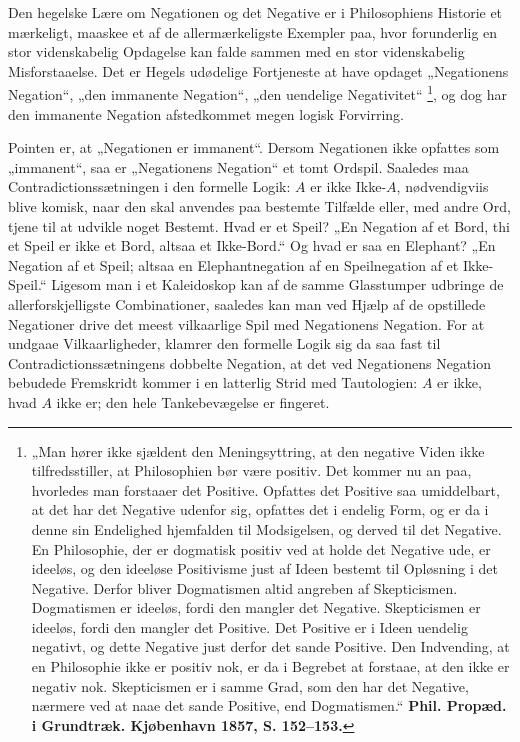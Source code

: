 \documentclass[11pt]{book}
\newcommand{\opage}[1]{\marginnote{\footnotesize\textit{[#1]}}}
\begin{document}
\opage{147} \setcounter{footnote}{0}%
Den hegelske Lære om Negationen og det Negative er i
Philosophiens Historie et mærkeligt, maaskee et af de allermærkeligste
Exempler paa, hvor forunderlig en stor videnskabelig Opdagelse kan
falde sammen med en stor videnskabelig Misforstaaelse. Det er Hegels
udødelige Fortjeneste at have opdaget „Negationens Negation“, „den
immanente Negation“, „den uendelige Negativitet“%
\footnote{%
„Man hører ikke sjældent den Meningsyttring, at den negative Viden
ikke tilfredsstiller, at Philosophien bør være positiv. Det kommer nu
an paa, hvorledes man forstaaer det Positive. Opfattes det Positive
saa umiddelbart, at det har det Negative udenfor sig, opfattes det i
endelig Form, og er da i denne sin Endelighed hjemfalden til
Modsigelsen, og derved til det Negative. En Philosophie, der er
dogmatisk positiv ved at holde det Negative ude, er ideeløs, og den
ideeløse Positivisme just af Ideen bestemt til Opløsning i det
Negative. Derfor bliver Dogmatismen altid angreben af Skepticismen.
Dogmatismen er ideeløs, fordi den mangler det Negative. Skepticismen
er ideeløs, fordi den mangler det Positive. Det Positive er i Ideen
uendelig negativt, og dette Negative just derfor det sande Positive.
Den Indvending, at en Philosophie ikke er positiv nok, er da i
Begrebet at forstaae, at den ikke er negativ nok. Skepticismen er i
samme Grad, som den har det Negative, nærmere ved at naae det sande
Positive, end Dogmatismen.“
\textbf{Phil. Propæd. i Grundtræk. Kjøbenhavn 1857, S. 152--153.}}, og
dog har den immanente Negation afstedkommet megen logisk Forvirring.

Pointen er, at „Negationen er immanent“. Dersom Negationen ikke
opfattes som „immanent“, saa er „Negationens Negation“ et tomt
Ordspil. Saaledes maa Contradictionssætningen i den formelle Logik:
$A$ er ikke Ikke-$A$, nødvendigviis blive komisk, naar den skal
anvendes paa bestemte Tilfælde eller, med andre Ord, tjene til at
udvikle noget Bestemt. Hvad er et Speil? „En Negation af et Bord, thi
et Speil er ikke et Bord, altsaa et Ikke-Bord.“ Og hvad er saa en
Elephant? „En Negation af et Speil; altsaa en Elephantnegation af en
Speilnegation af et Ikke-Speil.“ Ligesom
\opage{148} \setcounter{footnote}{0}%
man i et Kaleidoskop kan af de samme Glasstumper udbringe de
allerforskjelligste Combinationer, saaledes kan man ved Hjælp af de
opstillede Negationer drive det meest vilkaarlige Spil med Negationens
Negation. For at undgaae Vilkaarligheder, klamrer den formelle Logik
sig da saa fast til Contradictionssætningens dobbelte Negation, at det
ved Negationens Negation bebudede Fremskridt kommer i en latterlig
Strid med Tautologien: $A$ er ikke, hvad $A$ ikke er; den hele
Tankebevægelse er fingeret.
\end{document}
